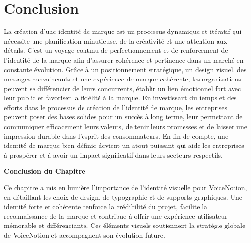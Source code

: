\section{Conclusion}
La création d'une identité de marque est un processus dynamique et itératif qui nécessite une planification minutieuse, de la créativité et une attention aux détails. C'est un voyage continu de perfectionnement et de renforcement de l'identité de la marque afin d'assurer cohérence et pertinence dans un marché en constante évolution. Grâce à un positionnement stratégique, un design visuel, des messages convaincants et une expérience de marque cohérente, les organisations peuvent se différencier de leurs concurrents, établir un lien émotionnel fort avec leur public et favoriser la fidélité à la marque. En investissant du temps et des efforts dans le processus de création de l'identité de marque, les entreprises peuvent poser des bases solides pour un succès à long terme, leur permettant de communiquer efficacement leurs valeurs, de tenir leurs promesses et de laisser une impression durable dans l'esprit des consommateurs. En fin de compte, une identité de marque bien définie devient un atout puissant qui aide les entreprises à prospérer et à avoir un impact significatif dans leurs secteurs respectifs.

\vspace{1cm}
\begin{center}
\textbf{\large Conclusion du Chapitre}
\end{center}

\noindent
Ce chapitre a mis en lumière l'importance de l'identité visuelle pour VoiceNotion, en détaillant les choix de design, de typographie et de supports graphiques. Une identité forte et cohérente renforce la crédibilité du projet, facilite la reconnaissance de la marque et contribue à offrir une expérience utilisateur mémorable et différenciante. Ces éléments visuels soutiennent la stratégie globale de VoiceNotion et accompagnent son évolution future.
